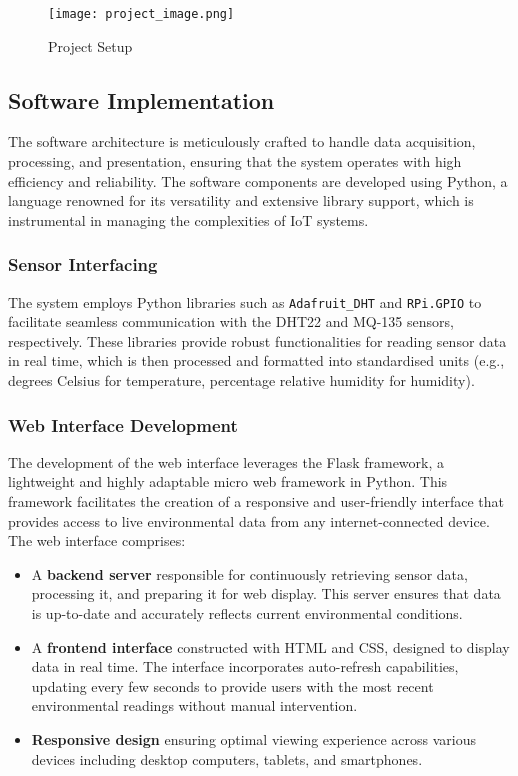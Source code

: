 \documentclass[a4paper, 12pt]{report}
\begin{document}
\begin{figure}[H]
    \centering
    \texttt{[image: project\_image.png]}
    \caption{Project Setup}
    \label{fig:project_image}
\end{figure}

\subsection{Software Implementation}
The software architecture is meticulously crafted to handle data acquisition, processing, and presentation, ensuring that the system operates with high efficiency and reliability. The software components are developed using Python, a language renowned for its versatility and extensive library support, which is instrumental in managing the complexities of IoT systems.

\subsubsection{Sensor Interfacing}
The system employs Python libraries such as \texttt{Adafruit\_DHT} and \texttt{RPi.GPIO} to facilitate seamless communication with the DHT22 and MQ-135 sensors, respectively. These libraries provide robust functionalities for reading sensor data in real time, which is then processed and formatted into standardised units (e.g., degrees Celsius for temperature, percentage relative humidity for humidity).

\subsubsection{Web Interface Development}
The development of the web interface leverages the Flask framework, a lightweight and highly adaptable micro web framework in Python. This framework facilitates the creation of a responsive and user-friendly interface that provides access to live environmental data from any internet-connected device. The web interface comprises:
\begin{itemize}
    \item A \textbf{backend server} responsible for continuously retrieving sensor data, processing it, and preparing it for web display. This server ensures that data is up-to-date and accurately reflects current environmental conditions.
    \item A \textbf{frontend interface} constructed with HTML and CSS, designed to display data in real time. The interface incorporates auto-refresh capabilities, updating every few seconds to provide users with the most recent environmental readings without manual intervention.
    \item \textbf{Responsive design} ensuring optimal viewing experience across various devices including desktop computers, tablets, and smartphones.
\end{itemize}
\end{document}
